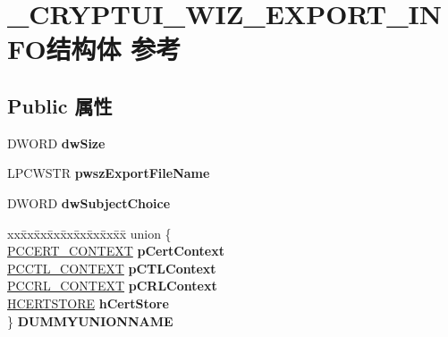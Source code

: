 \hypertarget{struct___c_r_y_p_t_u_i___w_i_z___e_x_p_o_r_t___i_n_f_o}{}\section{\+\_\+\+C\+R\+Y\+P\+T\+U\+I\+\_\+\+W\+I\+Z\+\_\+\+E\+X\+P\+O\+R\+T\+\_\+\+I\+N\+F\+O结构体 参考}
\label{struct___c_r_y_p_t_u_i___w_i_z___e_x_p_o_r_t___i_n_f_o}
\subsection*{Public 属性}
\begin{DoxyCompactItemize}
\item 
\mbox{\label{struct___c_r_y_p_t_u_i___w_i_z___e_x_p_o_r_t___i_n_f_o_a0fd818a1c8e057182833ea22a600f66c}} 
D\+W\+O\+RD {\bfseries dw\+Size}
\item 
\mbox{\label{struct___c_r_y_p_t_u_i___w_i_z___e_x_p_o_r_t___i_n_f_o_a59c62a01884f7caedd242a50790b4e47}} 
L\+P\+C\+W\+S\+TR {\bfseries pwsz\+Export\+File\+Name}
\item 
\mbox{\label{struct___c_r_y_p_t_u_i___w_i_z___e_x_p_o_r_t___i_n_f_o_af7dfd0c78522cf30c1dea38c9b252dc9}} 
D\+W\+O\+RD {\bfseries dw\+Subject\+Choice}
\item 
\mbox{\label{struct___c_r_y_p_t_u_i___w_i_z___e_x_p_o_r_t___i_n_f_o_a57fd05b944d7fc9683ad84206bb43a08}} 
\begin{tabbing}
xx\=xx\=xx\=xx\=xx\=xx\=xx\=xx\=xx\=\kill
union \{\\
\>\hyperlink{struct___c_e_r_t___c_o_n_t_e_x_t}{PCCERT\_CONTEXT} {\bfseries pCertContext}\\
\>\hyperlink{struct___c_t_l___c_o_n_t_e_x_t}{PCCTL\_CONTEXT} {\bfseries pCTLContext}\\
\>\hyperlink{struct___c_r_l___c_o_n_t_e_x_t}{PCCRL\_CONTEXT} {\bfseries pCRLContext}\\
\>\hyperlink{interfacevoid}{HCERTSTORE} {\bfseries hCertStore}\\
\} {\bfseries DUMMYUNIONNAME}\\


\end{tabbing}
\end{DoxyCompactItemize}
